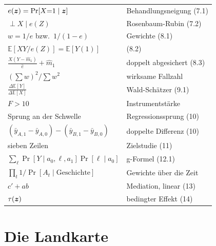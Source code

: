 \begin{merksatz}
\begin{center}
{\small
\renewcommand{\arraystretch}{1.6}
\begin{tabular}{@{}P{4.4cm}P{4.2cm}@{}}
\toprule
$e(\boldsymbol{z}) = \Pr[X{=}1\mid\boldsymbol{z}]$ & Behandlungsneigung (7.1)\\
$\perp X \mid e(Z)$ & Rosenbaum-Rubin (7.2)\\
$w = 1/e$ bzw.\ $1/(1-e)$ & Gewichte (8.1)\\
$\mathbb{E}[XY/e(Z)] = \mathbb{E}[Y(1)]$ & (8.2)\\
$\frac{X(Y-\hat m_1)}{\hat e} + \hat m_1$ & doppelt abgesichert (8.3)\\
$(\sum w)^{2}/\sum w^{2}$ & wirksame Fallzahl\\
$\frac{\Delta\mathbb{E}[Y]}{\Delta\mathbb{E}[X]}$ & Wald-Schätzer (9.1)\\
$F > 10$ & Instrumentstärke\\
Sprung an der Schwelle & Regressionssprung (10)\\
$(\bar y_{A,1}-\bar y_{A,0}) - (\bar y_{B,1}-\bar y_{B,0})$ & doppelte Differenz (10)\\
sieben Zeilen & Zielstudie (11)\\
$\sum_\ell \Pr[Y\mid a_0,\ell,a_1]\Pr[\ell\mid a_0]$ & g-Formel (12.1)\\
$\prod_t 1/\Pr[A_t \mid \text{Geschichte}]$ & Gewichte über die Zeit\\
$c' + ab$ & Mediation, linear (13)\\
$\tau(\boldsymbol{z})$ & bedingter Effekt (14)\\
\bottomrule
\end{tabular}}
\end{center}
\end{merksatz}

\section{Die Landkarte}

